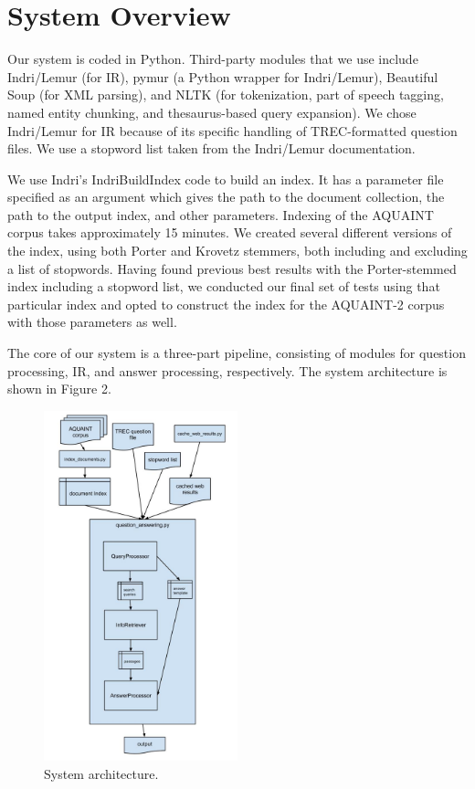 \documentclass[11pt]{article}
\begin{document}
\section{System Overview}

Our system is coded in Python. Third-party modules that we use include Indri/Lemur (for IR), pymur (a Python wrapper for Indri/Lemur), Beautiful Soup (for XML parsing), and NLTK (for tokenization, part of speech tagging, named entity chunking, and thesaurus-based query expansion). We chose Indri/Lemur for IR because of its specific handling of TREC-formatted question files. We use a stopword list taken from the Indri/Lemur documentation.

We use Indri's IndriBuildIndex code to build an index.  It has a parameter file specified as an argument which gives the path to the document collection, the path to the output index, and other parameters.  Indexing of the AQUAINT corpus takes approximately 15 minutes.  We created several different versions of the index, using both Porter and Krovetz stemmers, both including and excluding a list of stopwords. Having found previous best results with the Porter-stemmed index including a stopword list, we conducted our final set of tests using that particular index and opted to construct the index for the AQUAINT-2 corpus with those parameters as well.

The core of our system is a three-part pipeline, consisting of modules for question processing, IR, and answer processing, respectively. The system architecture is shown in Figure 2.

\begin{figure}
  \centering
    \includegraphics[width=0.5\textwidth]{system_architecture.jpg}
 \caption{System architecture.}
\end{figure}
\end{document}
